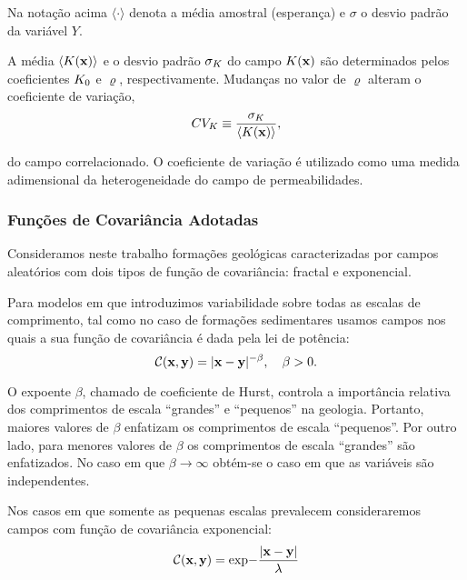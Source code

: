 \documentclass[12pt,a4paper,portuges]{article}
\renewcommand{\exp}{\mbox{exp}}
\begin{document}
\noindent 
 Na notação acima $\langle \cdot \rangle$ denota a média amostral
(esperança) e $\sigma$ o desvio padrão 
da variável $Y$. 


A  média $\langle K(\mathbf{x}) \rangle$ e o desvio padrão $\sigma_{K}$ do campo
$K(\mathbf{x})$ são determinados pelos coeficientes $K_{0}$ e $\varrho$, respectivamente.
Mudanças no valor de $\varrho$ alteram o coeficiente de variação,
\begin{equation}
	CV_{K} \equiv \frac{\sigma_{K}}{\langle K(\mathbf{x})
\rangle},
\label{cv}
\end{equation}

\noindent do campo correlacionado. O coeficiente de variação é utilizado como uma medida
adimensional da heterogeneidade do campo de permeabilidades. 

\subsubsection{Funções de Covariância Adotadas}

Consideramos neste trabalho formações geológicas 
caracterizadas por campos aleatórios com dois tipos de função de
covariância: fractal e exponencial. 

Para modelos em que introduzimos variabilidade sobre todas as
escalas de comprimento,  tal como no caso de formações 
sedimentares \citep{hewett86} usamos campos nos quais a sua função de covariância 
é dada pela lei de potência:
\begin{equation}
	\mathcal{C}(\mathbf{x}, \mathbf{y}) = |\mathbf{x}-\mathbf{y}|^{-\beta},
	\quad \beta > 0.
\label{covpot}
\end{equation}

O expoente $\beta$, chamado de coeficiente de Hurst,
controla a importância relativa dos comprimentos de escala ``grandes'' e
``pequenos'' na geologia. Portanto, maiores valores de $\beta$ enfatizam os
comprimentos de escala ``pequenos''. Por outro lado, para menores valores de
$\beta$ os comprimentos de escala ``grandes'' são enfatizados. No caso em que
$\beta \to \infty$ obtém-se o caso em que as variáveis são independentes.

Nos casos em que somente as pequenas escalas prevalecem consideraremos campos
com função de covariância  exponencial:
\begin{equation}
	\mathcal{C}(\vetor{x}, \vetor{y}) =
\exp{-\frac{|\vetor{x}-\vetor{y}|}{\lambda}}
\label{covpote}
\end{equation}
\end{document}
